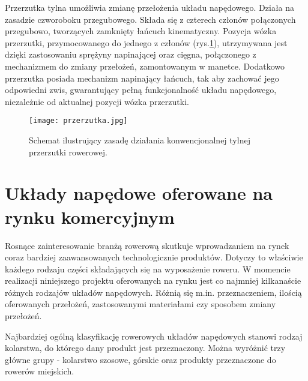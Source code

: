 Przerzutka tylna umożliwia zmianę przełożenia układu napędowego. Działa na zasadzie czworoboku przegubowego. Składa się z czterech członów połączonych przegubowo, tworzących zamknięty łańcuch kinematyczny. Pozycja wózka przerzutki, przymocowanego do jednego z członów (rys.\ref{fig:przerzutka}), utrzymywana jest dzięki zastosowaniu sprężyny napinającej oraz cięgna, połączonego z mechanizmem do zmiany przełożeń, zamontowanym w manetce. Dodatkowo przerzutka posiada mechanizm napinający łańcuch, tak aby zachować jego odpowiedni zwis, gwarantujący pełną funkcjonalność układu napędowego, niezależnie od aktualnej pozycji wózka przerzutki. 
\begin{figure}[h]
    \centering
    \texttt{[image: przerzutka.jpg]}
    \caption{Schemat ilustrujący zasadę działania konwencjonalnej tylnej przerzutki rowerowej.}
    \label{fig:przerzutka}
\end{figure}

\section{Układy napędowe oferowane na rynku komercyjnym}

Rosnące zainteresowanie branżą rowerową skutkuje wprowadzaniem na rynek coraz bardziej zaawansowanych technologicznie produktów. Dotyczy to właściwie każdego rodzaju części składających się na wyposażenie roweru. W momencie realizacji niniejszego projektu oferowanych na rynku jest co najmniej kilkanaście różnych rodzajów układów napędowych. Różnią się m.in. przeznaczeniem, ilością oferowanych przełożeń, zastosowanymi materiałami czy sposobem zmiany przełożeń.

Najbardziej ogólną klasyfikację rowerowych układów napędowych stanowi rodzaj kolarstwa, do którego dany produkt jest przeznaczony. Można wyróżnić trzy główne grupy - kolarstwo szosowe, górskie oraz produkty przeznaczone do rowerów miejskich.

